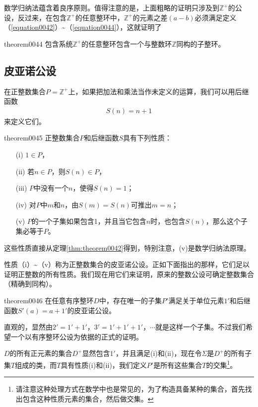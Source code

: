 数学归纳法蕴含着良序原则。值得注意的是，上面粗略的证明只涉及到$\mathbb{Z}^+$的公设，反过来，在包含$\mathbb{Z}^+$的任意整环中，$\mathbb{Z}^+$的元素之差$(a-b)$必须满足定义（\ref{equation0042}）\textasciitilde（\ref{equation0044}），这就证明了
\begin{theorem}{}{theorem0044}
包含系统$\mathbb{Z}^+$的任意整环包含一个与整数环$\mathbb{Z}$同构的子整环。
\end{theorem}


\subsection{皮亚诺公设}\label{subsection0010206}
在正整数集合$P=\mathbb{Z}^+$上，如果把加法和乘法当作未定义的运算，我们可以用后继函数
\begin{gather}\label{equation0045}
S(n)=n+1
\end{gather}
来定义它们。

\begin{theorem}{}{theorem0045}
正整数集合$P$和后继函数$S$具有下列性质：
\begin{enumerate}
\item[(i)] $1 \in P$，
\item[(ii)] 若$n \in P$，则$S(n) \in P$，
\item[(iii)] $P$中没有一个$n$，使得$S(n)=1$；
\item[(iv)] 对$P$中$m$和$n$，由$S(m)=S(n)$可推出$m=n$；
\item[(v)] $P$的一个子集如果包含1，并且当它包含$n$时，也包含$S(n)$，那么这个子集必等于$P$。
\end{enumerate}
\end{theorem}

这些性质直接从定理\ref{thm:theorem0042}得到，特别注意，(v)是数学归纳法原理。

性质（i）\textasciitilde（v）称为正整数集合的皮亚诺公设。正如下面指出的那样，它们足以证明正整数的所有性质。我们现在用它们来证明，原来的整数公设可确定整数集合（精确到同构）。

\begin{theorem}{}{theorem0046}
在任意有序整环$D$中，存在唯一的子集$P'$满足关于单位元素$1'$和后继函数$S'(a)=a+1'$的皮亚诺公设。
\end{theorem}

直观的，显然由$2'=1'+1'$，$3'=1'+1'+1'$，$\cdots$就是这样一个子集。不过我们希望一个以有序整环公设为依据的正式的证明。

$D$的所有正元素的集合$D^+$显然包含$1'$，并且满足(i)和(ii)，现在令$\Sigma$是$D^+$的所有子集$T$组成的类，而$T$具有性质(i)和(ii)，我们定义$P'$是所有这些集合$T$的交集\footnote{请注意这种处理方式在数学中也是常见的，为了构造具备某种的集合，首先找出包含这种性质元素的集合，然后做交集。}。

